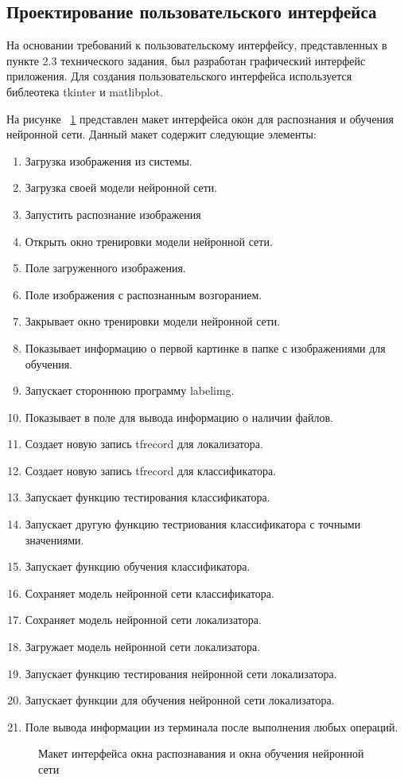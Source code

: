 \subsection{ Проектирование пользовательского интерфейса}
На основании требований к пользовательскому интерфейсу, представленных в пункте 2.3 технического задания, был разработан графический интерфейс приложения. Для создания пользовательского интерфейса используется библеотека tkinter и matlibplot.

На рисунке ~\ref{maketinterface:image} представлен макет интерфейса окон для распознания и обучения нейронной сети. Данный макет содержит следующие элементы:
\begin{enumerate}
\item Загрузка изображения из системы.
\item Загрузка своей модели нейронной сети.
\item Запустить распознание изображения
\item Открыть окно тренировки модели нейронной сети.
\item Поле загруженного изображения.
\item Поле изображения с распознанным возгоранием.
\item Закрывает окно тренировки модели нейронной сети.
\item Показывает информацию о первой картинке в папке с изображениями для обучения.
\item Запускает стороннюю программу labelimg.
\item Показывает в поле для вывода информацию о наличии файлов.
\item Создает новую запись tfrecord для локализатора.
\item Создает новую запись tfrecord для классификатора.
\item Запускает функцию тестирования классификатора.
\item Запускает другую функцию тестриования классификатора с точными значениями.
\item Запускает функцию обучения классификатора.
\item Сохраняет модель нейронной сети классификатора.
\item Сохраняет модель нейронной сети локализатора.
\item Загружает модель нейронной сети локализатора.
\item Запускает функцию тестирования нейронной сети локализатора.
\item Запускает функции для обучения нейронной сети локализатора.
\item Поле вывода информации из терминала после выполнения любых операций.
\end{enumerate}

\begin{figure}[H]
\caption{Макет интерфейса окна распознавания и окна обучения нейронной сети}
\label{maketinterface:image}
\end{figure}
